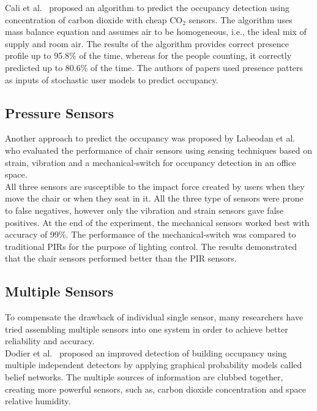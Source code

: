 Cali et al.~\cite{cali2015co2} proposed an algorithm to predict the occupancy detection using concentration of carbon dioxide with cheap CO$_{2}$ sensors. The algorithm uses mass balance equation and assumes air to be homogeneous, i.e., the ideal mix of supply and room air. The results of the algorithm provides correct presence profile up to 95.8\%  of the time, whereas for the people
counting, it correctly predicted up to 80.6\%  of the time. The authors of papers used presence patters as inputs of stochastic user models to predict occupancy. 


\subsection{Pressure Sensors}
Another approach to predict the occupancy was proposed by Labeodan et al.~\cite{labeodan2016experimental} who evaluated the performance of chair sensors using sensing techniques based on strain, vibration and a mechanical-switch for occupancy detection in an office space.
\\
All three sensors are susceptible to the impact force created by users when they move the chair or when they seat in it. All the three type of sensors were prone to false negatives, however only the vibration and strain sensors gave false positives. At the end of the experiment, the mechanical sensors worked best with accuracy of 99\%. The performance of the mechanical-switch was compared to traditional PIRs for the purpose of lighting control. The results demonstrated that the chair sensors performed better than the PIR sensors.


\subsection{Multiple Sensors}

To compensate the drawback of individual single sensor, many researchers have tried assembling multiple sensors into one system in order to achieve better reliability and accuracy.
\\

Dodier et al.~\cite{dodier2006building} proposed an improved detection of building occupancy using multiple independent detectors by applying graphical probability models called belief networks. The multiple sources of information are clubbed together, creating more powerful sensors, such as, carbon dioxide concentration and space relative humidity.
\\



